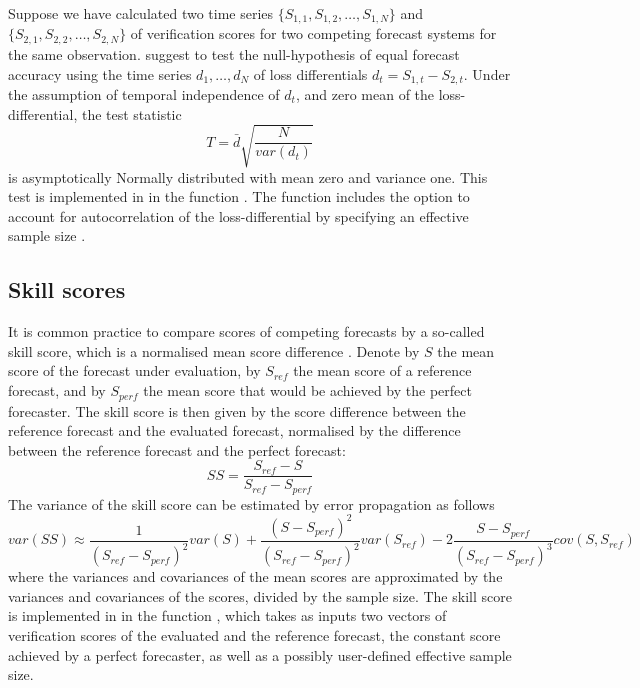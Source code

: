 \documentclass[article]{jss}
\begin{document}
Suppose we have calculated two time series $\{S_{1,1}, S_{1,2}, \dots, S_{1,N}\}$ and $\{S_{2,1}, S_{2,2}, \dots, S_{2,N}\}$ of verification scores for two competing forecast systems for the same observation.
\citet{diebold1995comparing} suggest to test the null-hypothesis of equal forecast accuracy using the time series $d_1, \dots, d_N$ of loss differentials $d_t = S_{1,t} - S_{2,t}$. 
Under the assumption of temporal independence of $d_t$, and zero mean of the loss-differential, the test statistic 
%
\begin{equation}
T = \bar{d}\sqrt{\frac{N}{var(d_t)}}
\end{equation}
%
is asymptotically Normally distributed with mean zero and variance one.
This test is implemented in  in the function .
The function includes the option to account for autocorrelation of the loss-differential by specifying an effective sample size .




\subsection{Skill scores}

It is common practice to compare scores of competing forecasts by a so-called skill score, which is a normalised mean score difference \citep{wilks2011statistical}.
Denote by $S$ the mean score of the forecast under evaluation, by $S_{ref}$ the mean score of a reference forecast, and by $S_{perf}$ the mean score that would be achieved by the perfect forecaster.
The skill score is then given by the score difference between the reference forecast and the evaluated forecast, normalised by the difference between the reference forecast and the perfect forecast:
%
\begin{equation}
SS = \frac{S_{ref} - S}{S_{ref} - S_{perf}}
\end{equation}
%
The variance of the skill score can be estimated by error propagation as follows
%
\begin{equation}
var(SS) \approx \frac{1}{(S_{ref} - S_{perf})^2} var(S) + \frac{(S - S_{perf})^2}{(S_{ref}-S_{perf})^2} var(S_{ref}) - 2 \frac{S-S_{perf}}{(S_{ref}-S_{perf})^3} cov(S, S_{ref})
\end{equation}
%
where the variances and covariances of the mean scores are approximated by the variances and covariances of the scores, divided by the sample size.
The skill score is implemented in  in the function , which takes as inputs two vectors of verification scores of the evaluated and the reference forecast, the constant score achieved by a perfect forecaster, as well as a possibly user-defined effective sample size.
\end{document}
